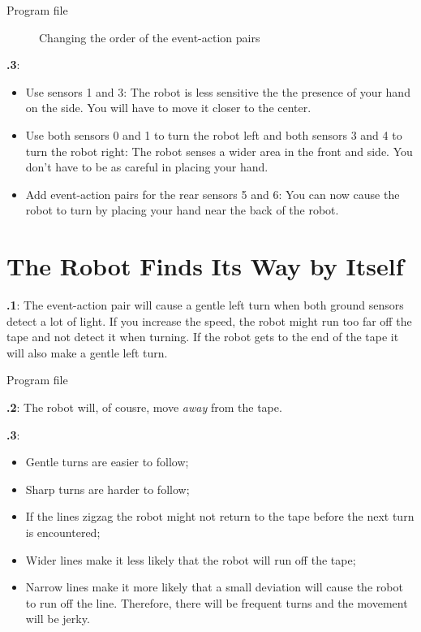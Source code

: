 \documentclass[12pt,a4paper,english]{article}
\begin{document}
{\raggedleft \hfill Program file }

\begin{figure}[hbt]
\begin{center}
\caption{Changing the order of the event-action pairs}\label{fig.change}
\end{center}
\end{figure}

\textbf{\thesection.3}: 
\begin{itemize}

\item Use sensors 1 and 3: The robot is less sensitive the the presence
of your hand on the side. You will have to move it closer to the center.

\item Use both sensors 0 and 1 to turn the robot left and both sensors 3
and 4 to turn the robot right: The robot senses a wider area in the
front and side. You don't have to be as careful in placing your hand.

\item Add event-action pairs for the rear sensors 5 and 6: You can now
cause the robot to turn by placing your hand near the back of the robot.

\end{itemize}


\section{The Robot Finds Its Way by Itself}


\textbf{\thesection.1}: The event-action pair 
will cause a gentle left turn when both ground sensors detect a lot of
light. If you increase the speed, the robot might run too far off the
tape and not detect it when turning. If the robot gets to the end of the
tape it will also make a gentle left turn.

{\raggedleft \hfill Program file }

\textbf{\thesection.2}: The robot will, of cousre, move \emph{away} from
the tape.

\textbf{\thesection.3}:
\begin{itemize}
\item Gentle turns are easier to follow; 
\item Sharp turns are harder to follow; 
\item If the lines zigzag the robot might not return to the tape before
the next turn is encountered;  
\item Wider lines make it less likely that the robot will run off the tape; 
\item Narrow lines make it more likely that a small deviation will cause
the robot to run off the line. Therefore, there will be frequent turns
and the movement will be jerky.
\end{itemize}
\end{document}
